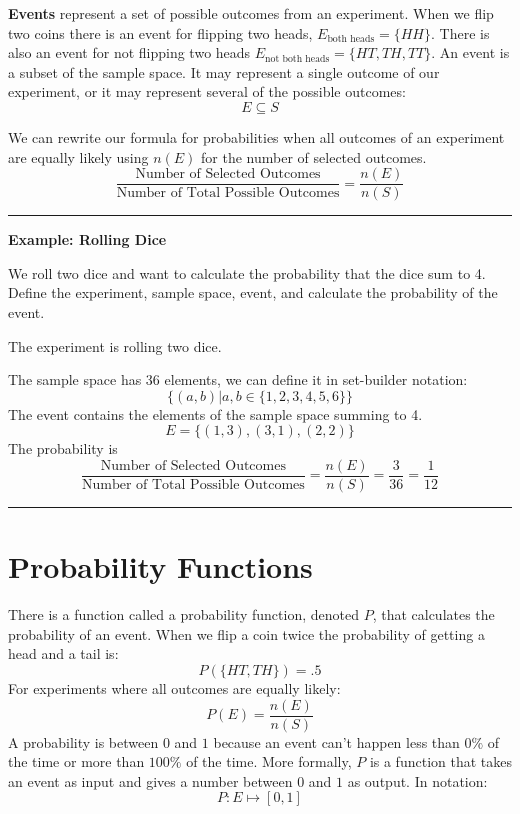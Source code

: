\documentclass[
]{book}
\theoremstyle{definition}
\theoremstyle{definition}
\theoremstyle{definition}
\theoremstyle{remark}
\begin{document}
\textbf{Events} represent a set of possible outcomes from an experiment. When we flip two coins there is an event for flipping two heads, \(E_\text{both heads}=\{HH\}\). There is also an event for not flipping two heads \(E_\text{not both heads}=\{HT,TH,TT\}\). An event is a subset of the sample space. It may represent a single outcome of our experiment, or it may represent several of the possible outcomes:
\[E \subseteq S\]

We can rewrite our formula for probabilities when all outcomes of an experiment are equally likely using \(n(E)\) for the number of selected outcomes.
\[\frac{\text{Number of Selected Outcomes}}{\text{Number of Total Possible Outcomes}} = \frac{n(E)}{n(S)}\]

\begin{center}\rule{0.5\linewidth}{0.5pt}\end{center}

\textbf{Example: Rolling Dice}

We roll two dice and want to calculate the probability that the dice sum to 4. Define the experiment, sample space, event, and calculate the probability of the event.

The experiment is rolling two dice.

The sample space has 36 elements, we can define it in set-builder notation:
\[\{(a,b)|a,b \in \{1,2,3,4,5,6\}\}\]
The event contains the elements of the sample space summing to 4.
\[E = \{(1,3),(3,1),(2,2)\}\]
The probability is
\[\frac{\text{Number of Selected Outcomes}}{\text{Number of Total Possible Outcomes}} = \frac{n(E)}{n(S)} = \frac{3}{36}=\frac{1}{12}\]

\begin{center}\rule{0.5\linewidth}{0.5pt}\end{center}

\hypertarget{probability-functions}{%
\section{Probability Functions}\label{probability-functions}}

There is a function called a probability function, denoted \(P\), that calculates the probability of an event. When we flip a coin twice the probability of getting a head and a tail is:
\[P(\{HT, TH\})=.5\]
For experiments where all outcomes are equally likely:
\[P(E) = \frac{n(E)}{n(S)}\]
A probability is between \(0\) and \(1\) because an event can't happen less than \(0\%\) of the time or more than \(100\%\) of the time. More formally, \(P\) is a function that takes an event as input and gives a number between \(0\) and \(1\) as output. In notation:
\[P:E \mapsto [0,1]\]
\end{document}
